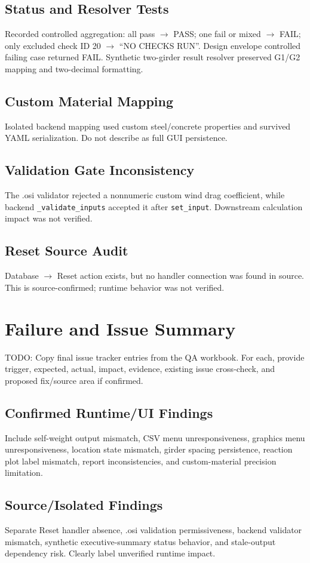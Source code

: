 \documentclass[11pt,a4paper]{report}
\begin{document}
\section{Status and Resolver Tests}
Recorded controlled aggregation: all pass $\rightarrow$ PASS; one fail or mixed $\rightarrow$ FAIL; only excluded check ID 20 $\rightarrow$ ``NO CHECKS RUN''. Design envelope controlled failing case returned FAIL. Synthetic two-girder result resolver preserved G1/G2 mapping and two-decimal formatting.
\section{Custom Material Mapping}
Isolated backend mapping used custom steel/concrete properties and survived YAML serialization. Do not describe as full GUI persistence.
\section{Validation Gate Inconsistency}
The .osi validator rejected a nonnumeric custom wind drag coefficient, while backend \texttt{\_validate\_inputs} accepted it after \texttt{set\_input}. Downstream calculation impact was not verified.
\section{Reset Source Audit}
Database $\rightarrow$ Reset action exists, but no handler connection was found in source. This is source-confirmed; runtime behavior was not verified.

\chapter{Failure and Issue Summary}
TODO: Copy final issue tracker entries from the QA workbook. For each, provide trigger, expected, actual, impact, evidence, existing issue cross-check, and proposed fix/source area if confirmed.
\section{Confirmed Runtime/UI Findings}
Include self-weight output mismatch, CSV menu unresponsiveness, graphics menu unresponsiveness, location state mismatch, girder spacing persistence, reaction plot label mismatch, report inconsistencies, and custom-material precision limitation.
\section{Source/Isolated Findings}
Separate Reset handler absence, .osi validation permissiveness, backend validator mismatch, synthetic executive-summary status behavior, and stale-output dependency risk. Clearly label unverified runtime impact.
\end{document}
